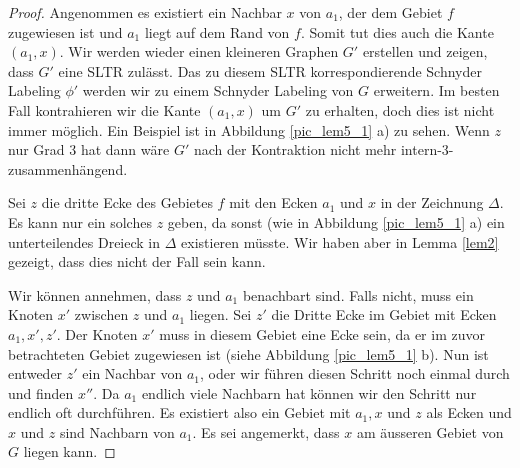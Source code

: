 \begin{proof}
Angenommen es existiert ein Nachbar $x$ von $a_1$, der dem Gebiet $f$ zugewiesen ist und $a_1$ liegt auf dem Rand von $f$. Somit tut dies auch die Kante $(a_1,x)$. Wir werden wieder einen kleineren Graphen $G'$ erstellen und zeigen, dass $G'$ eine SLTR zulässt. Das zu diesem SLTR korrespondierende Schnyder Labeling $\phi'$ werden wir zu einem Schnyder Labeling von $G$ erweitern. Im besten Fall kontrahieren wir die Kante $(a_1,x)$ um $G'$ zu erhalten, doch dies ist nicht immer möglich. Ein Beispiel ist in Abbildung \ref{pic_lem5_1} a) zu sehen. Wenn $z$ nur Grad 3 hat dann wäre $G'$ nach der Kontraktion nicht mehr intern-3-zusammenhängend.

Sei $z$ die dritte Ecke des Gebietes $f$ mit den Ecken $a_1$ und $x$ in der Zeichnung $\Delta$. Es kann nur ein solches $z$ geben, da sonst (wie in Abbildung \ref{pic_lem5_1} a) ein unterteilendes Dreieck in $\Delta$ existieren müsste. Wir haben aber in Lemma \ref{lem2} gezeigt, dass dies nicht der Fall sein kann.

Wir können annehmen, dass $z$ und $a_1$ benachbart sind. Falls nicht, muss ein Knoten $x'$ zwischen $z$ und $a_1$ liegen. Sei $z'$ die Dritte Ecke im Gebiet mit Ecken $a_1,x',z'$. Der Knoten $x'$ muss in diesem Gebiet eine Ecke sein, da er im zuvor betrachteten Gebiet zugewiesen ist (siehe Abbildung \ref{pic_lem5_1} b). Nun ist entweder $z'$ ein Nachbar von $a_1$, oder wir führen diesen Schritt noch einmal durch und finden $x''$. Da $a_1$ endlich viele Nachbarn hat können wir den Schritt nur endlich oft durchführen. Es existiert also ein Gebiet mit $a_1, x$ und $z$ als Ecken und $x$ und $z$ sind Nachbarn von $a_1$. Es sei angemerkt, dass $x$ am äusseren Gebiet von $G$ liegen kann.


\end{proof}
